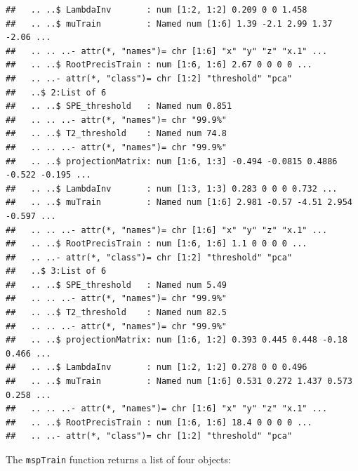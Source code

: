 \documentclass{report}\usepackage[]{graphicx}\usepackage[]{color}
\makeatletter
\newenvironment{kframe}{%
 \def\at@end@of@kframe{}%
 \ifinner\ifhmode%
  \def\at@end@of@kframe{\end{minipage}}%
  \begin{minipage}{\columnwidth}%
 \fi\fi%
 \def\FrameCommand##1{\hskip\@totalleftmargin \hskip-\fboxsep
 \colorbox{shadecolor}{##1}\hskip-\fboxsep
     \hskip-\linewidth \hskip-\@totalleftmargin \hskip\columnwidth}%
 \MakeFramed {\advance\hsize-\width
   \@totalleftmargin\z@ \linewidth\hsize
   \@setminipage}}%
 {\par\unskip\endMakeFramed%
 \at@end@of@kframe}
\newenvironment{knitrout}{}{} %
\makeatother
\begin{document}
\begin{knitrout}
\begin{kframe}
\begin{verbatim}
##   .. ..$ LambdaInv       : num [1:2, 1:2] 0.209 0 0 1.458
##   .. ..$ muTrain         : Named num [1:6] 1.39 -2.1 2.99 1.37 -2.06 ...
##   .. .. ..- attr(*, "names")= chr [1:6] "x" "y" "z" "x.1" ...
##   .. ..$ RootPrecisTrain : num [1:6, 1:6] 2.67 0 0 0 0 ...
##   .. ..- attr(*, "class")= chr [1:2] "threshold" "pca"
##   ..$ 2:List of 6
##   .. ..$ SPE_threshold   : Named num 0.851
##   .. .. ..- attr(*, "names")= chr "99.9%"
##   .. ..$ T2_threshold    : Named num 74.8
##   .. .. ..- attr(*, "names")= chr "99.9%"
##   .. ..$ projectionMatrix: num [1:6, 1:3] -0.494 -0.0815 0.4886 -0.522 -0.195 ...
##   .. ..$ LambdaInv       : num [1:3, 1:3] 0.283 0 0 0 0.732 ...
##   .. ..$ muTrain         : Named num [1:6] 2.981 -0.57 -4.51 2.954 -0.597 ...
##   .. .. ..- attr(*, "names")= chr [1:6] "x" "y" "z" "x.1" ...
##   .. ..$ RootPrecisTrain : num [1:6, 1:6] 1.1 0 0 0 0 ...
##   .. ..- attr(*, "class")= chr [1:2] "threshold" "pca"
##   ..$ 3:List of 6
##   .. ..$ SPE_threshold   : Named num 5.49
##   .. .. ..- attr(*, "names")= chr "99.9%"
##   .. ..$ T2_threshold    : Named num 82.5
##   .. .. ..- attr(*, "names")= chr "99.9%"
##   .. ..$ projectionMatrix: num [1:6, 1:2] 0.393 0.445 0.448 -0.18 0.466 ...
##   .. ..$ LambdaInv       : num [1:2, 1:2] 0.278 0 0 0.496
##   .. ..$ muTrain         : Named num [1:6] 0.531 0.272 1.437 0.573 0.258 ...
##   .. .. ..- attr(*, "names")= chr [1:6] "x" "y" "z" "x.1" ...
##   .. ..$ RootPrecisTrain : num [1:6, 1:6] 18.4 0 0 0 0 ...
##   .. ..- attr(*, "class")= chr [1:2] "threshold" "pca"
\end{verbatim}
\end{kframe}
\end{knitrout}
The \texttt{mspTrain} function returns a list of four objects:
\end{document}

